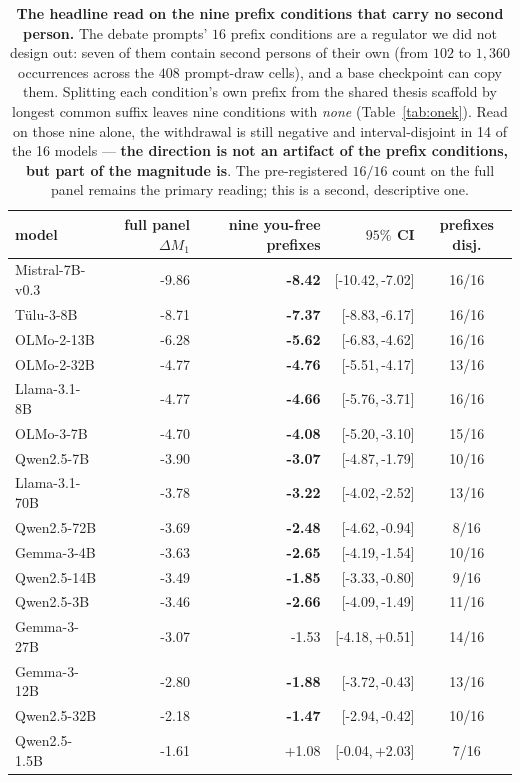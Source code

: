 \begin{table}[t]\centering\small
\caption{\textbf{The headline read on the nine prefix conditions that carry no second person.} The debate prompts' $16$ prefix conditions are a regulator we did not design out: seven of them contain second persons of their own (from $102$ to $1{,}360$ occurrences across the $408$ prompt-draw cells), and a base checkpoint can copy them. Splitting each condition's own prefix from the shared thesis scaffold by longest common suffix leaves nine conditions with \emph{none} (Table~\ref{tab:onek}). Read on those nine alone, the withdrawal is still negative and interval-disjoint in 14 of the 16 models --- \textbf{the direction is not an artifact of the prefix conditions, but part of the magnitude is}. The pre-registered $16/16$ count on the full panel remains the primary reading; this is a second, descriptive one.}
\label{tab:youfree}
\begin{tabular}{lrrrc}
\toprule
model & full panel $\Delta M_1$ & nine you-free prefixes & $95\%$ CI & prefixes disj. \\
\midrule
Mistral-7B-v0.3 & -9.86 & \textbf{-8.42} & [-10.42,\,-7.02] & 16/16 \\
T\"ulu-3-8B & -8.71 & \textbf{-7.37} & [-8.83,\,-6.17] & 16/16 \\
OLMo-2-13B & -6.28 & \textbf{-5.62} & [-6.83,\,-4.62] & 16/16 \\
OLMo-2-32B & -4.77 & \textbf{-4.76} & [-5.51,\,-4.17] & 13/16 \\
Llama-3.1-8B & -4.77 & \textbf{-4.66} & [-5.76,\,-3.71] & 16/16 \\
OLMo-3-7B & -4.70 & \textbf{-4.08} & [-5.20,\,-3.10] & 15/16 \\
Qwen2.5-7B & -3.90 & \textbf{-3.07} & [-4.87,\,-1.79] & 10/16 \\
Llama-3.1-70B & -3.78 & \textbf{-3.22} & [-4.02,\,-2.52] & 13/16 \\
Qwen2.5-72B & -3.69 & \textbf{-2.48} & [-4.62,\,-0.94] & 8/16 \\
Gemma-3-4B & -3.63 & \textbf{-2.65} & [-4.19,\,-1.54] & 10/16 \\
Qwen2.5-14B & -3.49 & \textbf{-1.85} & [-3.33,\,-0.80] & 9/16 \\
Qwen2.5-3B & -3.46 & \textbf{-2.66} & [-4.09,\,-1.49] & 11/16 \\
Gemma-3-27B & -3.07 & -1.53 & [-4.18,\,+0.51] & 14/16 \\
Gemma-3-12B & -2.80 & \textbf{-1.88} & [-3.72,\,-0.43] & 13/16 \\
Qwen2.5-32B & -2.18 & \textbf{-1.47} & [-2.94,\,-0.42] & 10/16 \\
Qwen2.5-1.5B & -1.61 & +1.08 & [-0.04,\,+2.03] & 7/16 \\
\bottomrule
\end{tabular}
\end{table}
